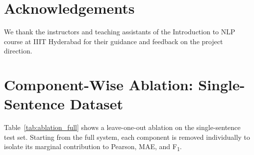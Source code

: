 \documentclass[11pt]{article}
\begin{document}
\section*{Acknowledgements}
We thank the instructors and teaching assistants of the Introduction to NLP course at IIIT Hyderabad for their guidance and feedback on the project direction.



\appendix

\section{Component-Wise Ablation: Single-Sentence Dataset}
\label{app:ablation_folds}

Table~\ref{tab:ablation_full} shows a leave-one-out ablation on the single-sentence test set. Starting from the full system, each component is removed individually to isolate its marginal contribution to Pearson, MAE, and F\textsubscript{1}.

\begin{table}[h]
  \centering
  \caption{Component-wise ablation (single-sentence test set). F\textsubscript{1} scores include 95\% bootstrap confidence intervals. Removing the GNN branch degrades performance most severely (Pearson drops from 0.676 to 0.268). Karak Validator and NER Soft Matching are the next largest contributors.}
  \label{tab:ablation_full}
\end{table}
\end{document}
